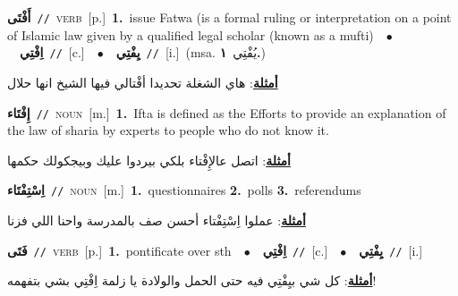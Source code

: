 \documentclass[10pt,a4paper,twoside]{article} %
\begin{document}
\begin{multicols}{2}
{\setlength\topsep{0pt}\textbf{\foreignlanguage{arabic}{أَفْتَى}}\ {\color{gray}\texttt{//}\color{black}}\ \textsc{verb}\ [p.]\ \textbf{1.}~issue Fatwa (is a formal ruling or interpretation on a point of Islamic law given by a qualified legal scholar (known as a mufti)\ \ $\bullet$\ \ \setlength\topsep{0pt}\textbf{\foreignlanguage{arabic}{اِفْتِي}}\ {\color{gray}\texttt{//}\color{black}}\ [c.]\ \ $\bullet$\ \ \setlength\topsep{0pt}\textbf{\foreignlanguage{arabic}{يِفْتِي}}\ {\color{gray}\texttt{//}\color{black}}\ [i.]\ \color{gray}(msa. \foreignlanguage{arabic}{يُفْتِي}~\foreignlanguage{arabic}{\textbf{١.}})\color{black}\  \begin{flushright}\color{gray}\foreignlanguage{arabic}{\textbf{\underline{\foreignlanguage{arabic}{أمثلة}}}: هاي الشغلة تحديدا أفْتالي فيها الشيخ انها حلال}\end{flushright}\color{black}} \vspace{2mm}

{\setlength\topsep{0pt}\textbf{\foreignlanguage{arabic}{إِفْتَاء}}\ {\color{gray}\texttt{//}\color{black}}\ \textsc{noun}\ [m.]\ \textbf{1.}~Ifta is defined as the Efforts to provide an explanation of the law of sharia by experts to people who do not know it.\  \begin{flushright}\color{gray}\foreignlanguage{arabic}{\textbf{\underline{\foreignlanguage{arabic}{أمثلة}}}: اتصل عالإِفْتاء بلكي بيردوا عليك وبيجكولك حكمها}\end{flushright}\color{black}} \vspace{2mm}

{\setlength\topsep{0pt}\textbf{\foreignlanguage{arabic}{اِسْتِفْتَاء}}\ {\color{gray}\texttt{//}\color{black}}\ \textsc{noun}\ [m.]\ \textbf{1.}~questionnaires  \textbf{2.}~polls  \textbf{3.}~referendums\  \begin{flushright}\color{gray}\foreignlanguage{arabic}{\textbf{\underline{\foreignlanguage{arabic}{أمثلة}}}: عملوا اِسْتِفْتاء أحسن صف بالمدرسة واحنا اللي فزنا}\end{flushright}\color{black}} \vspace{2mm}

{\setlength\topsep{0pt}\textbf{\foreignlanguage{arabic}{فَتَى}}\ {\color{gray}\texttt{//}\color{black}}\ \textsc{verb}\ [p.]\ \textbf{1.}~pontificate over sth\ \ $\bullet$\ \ \setlength\topsep{0pt}\textbf{\foreignlanguage{arabic}{اِفْتِي}}\ {\color{gray}\texttt{//}\color{black}}\ [c.]\ \ $\bullet$\ \ \setlength\topsep{0pt}\textbf{\foreignlanguage{arabic}{يِفْتِي}}\ {\color{gray}\texttt{//}\color{black}}\ [i.]\  \begin{flushright}\color{gray}\foreignlanguage{arabic}{\textbf{\underline{\foreignlanguage{arabic}{أمثلة}}}: كل شي بيِفْتِي فيه حتى الحمل والولادة يا زلمة اِفْتِي بشي بتفهمه!}\end{flushright}\color{black}} \vspace{2mm}


\end{multicols}
\end{document}
